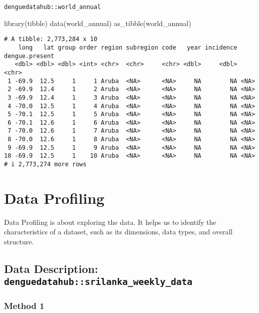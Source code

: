 \documentclass[
  letterpaper,
  DIV=11,
  numbers=noendperiod]{scrreprt}
\newenvironment{Shaded}{\begin{snugshade}}{\end{snugshade}}
\newcommand{\FunctionTok}[1]{\textcolor[rgb]{0.28,0.35,0.67}{#1}}
\newcommand{\NormalTok}[1]{\textcolor[rgb]{0.00,0.23,0.31}{#1}}
\begin{document}
\texttt{denguedatahub::world\_annual}

\begin{Shaded}
\begin{Highlighting}[]
\FunctionTok{library}\NormalTok{(tibble)}
\FunctionTok{data}\NormalTok{(world\_annual)}
\FunctionTok{as\_tibble}\NormalTok{(world\_annual)}
\end{Highlighting}
\end{Shaded}

\begin{verbatim}
# A tibble: 2,773,284 x 10
    long   lat group order region subregion code   year incidence dengue.present
   <dbl> <dbl> <dbl> <int> <chr>  <chr>     <chr> <dbl>     <dbl> <chr>         
 1 -69.9  12.5     1     1 Aruba  <NA>      <NA>     NA        NA <NA>          
 2 -69.9  12.4     1     2 Aruba  <NA>      <NA>     NA        NA <NA>          
 3 -69.9  12.4     1     3 Aruba  <NA>      <NA>     NA        NA <NA>          
 4 -70.0  12.5     1     4 Aruba  <NA>      <NA>     NA        NA <NA>          
 5 -70.1  12.5     1     5 Aruba  <NA>      <NA>     NA        NA <NA>          
 6 -70.1  12.6     1     6 Aruba  <NA>      <NA>     NA        NA <NA>          
 7 -70.0  12.6     1     7 Aruba  <NA>      <NA>     NA        NA <NA>          
 8 -70.0  12.6     1     8 Aruba  <NA>      <NA>     NA        NA <NA>          
 9 -69.9  12.5     1     9 Aruba  <NA>      <NA>     NA        NA <NA>          
10 -69.9  12.5     1    10 Aruba  <NA>      <NA>     NA        NA <NA>          
# i 2,773,274 more rows
\end{verbatim}

\section{Data Profiling}\label{data-profiling}

Data Profiling is about exploring the data. It helps us to identify the
characteristics of a dataset, such as its dimensions, data types, and
overall structure.

\subsection{\texorpdfstring{Data Description:
\texttt{denguedatahub::srilanka\_weekly\_data}}{Data Description: denguedatahub::srilanka\_weekly\_data}}\label{data-description-denguedatahubsrilanka_weekly_data}

\subsubsection{Method 1}\label{method-1}
\end{document}
